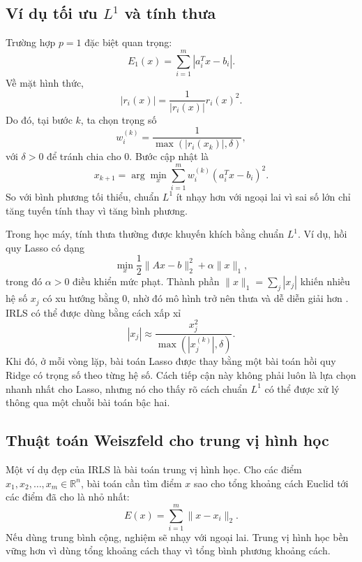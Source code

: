 \subsection{Ví dụ tối ưu \texorpdfstring{$L^1$}{L1} và tính thưa}
\label{SUB_SEC_l1_irls}
Trường hợp $p=1$ đặc biệt quan trọng:
\begin{equation}
    E_1(x)=\sum_{i=1}^{m}|a_i^{T}x-b_i|.
    \label{eq_l1_objective}
\end{equation}
Về mặt hình thức,
\begin{equation}
    |r_i(x)|=\frac{1}{|r_i(x)|}r_i(x)^2.
    \label{eq_l1_weight_form}
\end{equation}
Do đó, tại bước $k$, ta chọn trọng số
\begin{equation}
    w_i^{(k)}
    =
    \frac{1}{\max(|r_i(x_k)|,\delta)},
    \label{eq_l1_weight_delta}
\end{equation}
với $\delta>0$ để tránh chia cho $0$. Bước cập nhật là
\begin{equation}
    x_{k+1}
    =
    \arg\min_x
    \sum_{i=1}^{m} w_i^{(k)}(a_i^{T}x-b_i)^2.
    \label{eq_l1_irls_step}
\end{equation}
So với bình phương tối thiểu, chuẩn $L^1$ ít nhạy hơn với ngoại lai vì sai số lớn chỉ tăng tuyến tính thay vì tăng bình phương.
\medskip

Trong học máy, tính thưa thường được khuyến khích bằng chuẩn $L^1$. Ví dụ, hồi quy Lasso có dạng
\begin{equation}
    \min_x
    \frac{1}{2}\|Ax-b\|_2^2+\alpha\|x\|_1,
    \label{eq_lasso_intro_irls}
\end{equation}
trong đó $\alpha>0$ điều khiển mức phạt. Thành phần $\|x\|_1=\sum_j |x_j|$ khiến nhiều hệ số $x_j$ có xu hướng bằng $0$, nhờ đó mô hình trở nên thưa và dễ diễn giải hơn \cite{Tibshirani1996}. IRLS có thể được dùng bằng cách xấp xỉ
\begin{equation}
    |x_j|\approx \frac{x_j^2}{\max(|x_j^{(k)}|,\delta)}.
    \label{eq_lasso_irls_penalty}
\end{equation}
Khi đó, ở mỗi vòng lặp, bài toán Lasso được thay bằng một bài toán hồi quy Ridge có trọng số theo từng hệ số. Cách tiếp cận này không phải luôn là lựa chọn nhanh nhất cho Lasso, nhưng nó cho thấy rõ cách chuẩn $L^1$ có thể được xử lý thông qua một chuỗi bài toán bậc hai.

\subsection{Thuật toán Weiszfeld cho trung vị hình học}
\label{SUB_SEC_weiszfeld}
Một ví dụ đẹp của IRLS là bài toán trung vị hình học. Cho các điểm $x_1,x_2,\dots,x_m\in\mathbb{R}^{n}$, bài toán cần tìm điểm $x$ sao cho tổng khoảng cách Euclid tới các điểm đã cho là nhỏ nhất:
\begin{equation}
    E(x)=\sum_{i=1}^{m}\|x-x_i\|_2.
    \label{eq_geometric_median}
\end{equation}
Nếu dùng trung bình cộng, nghiệm sẽ nhạy với ngoại lai. Trung vị hình học bền vững hơn vì dùng tổng khoảng cách thay vì tổng bình phương khoảng cách.
\medskip

